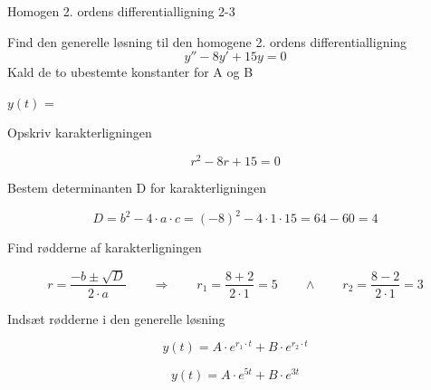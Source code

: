 \documentclass{article}
\begin{document}
\begin{exercise}{Homogen 2. ordens differentialligning 2-3}
	
	Find den generelle løsning til den homogene 2. ordens differentialligning
\[
y'' - 8y' + 15y = 0
\]
Kald de to ubestemte konstanter for A og B

$y(t)$ = 


\hint 

Opskriv karakterligningen

\hint

\[
r^2 -8r + 15 = 0
\]


\hint

Bestem determinanten D for karakterligningen


\hint 
\[
D = b^2 - 4 \cdot a \cdot c = (-8)^2 - 4 \cdot 1 \cdot 15  = 64 - 60 = 4
\]

\hint 
Find rødderne af karakterligningen


\hint

\[
r = \frac{-b \pm \sqrt{D}}{2 \cdot a} \qquad  \Rightarrow \qquad r_1 = \frac{8 + 2}{2 \cdot 1} = 5 \qquad \wedge \qquad r_2 = \frac{8- 2}{2 \cdot 1} = 3
\]

\hint

Indsæt rødderne i den generelle løsning

\hint
\[
y(t) = A \cdot e^{r_1 \cdot t} + B \cdot e^{r_2\cdot t}
\]

\hint

\[
y(t) = A \cdot e^{5t} + B \cdot e^{3t}
\]
	
\end{exercise}

\newpage
\end{document}
